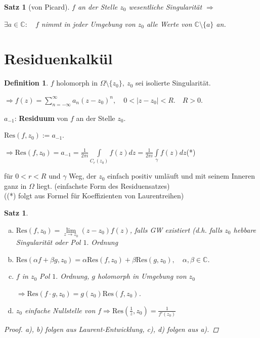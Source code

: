 \documentclass[ngerman,halfparskip]{scrartcl}
\newtheorem{satz}{Satz}[section]
\newtheorem*{satz*}{Satz}
\theoremstyle{definition}
\newtheorem{defin}{Definition}[section]
\def\C{\mathbb C}
\def\Res{\text{Res}}
\begin{document}
\begin{satz*}[von Picard]
$f$ an der Stelle $z_0$ wesentliche Singularität $\Rightarrow$

$\exists a\in\C: \quad f$ nimmt in jeder Umgebung von $z_0$ alle Werte von $\C\setminus\{a\}$ an.
\end{satz*}




\section{Residuenkalkül}
\begin{defin}
$f$ holomorph in $\Omega \setminus \{z_0\}, ~z_0$ sei isolierte Singularität. 

$\Rightarrow f(z)=\sum\limits_{n=-\infty}^\infty a_n(z-z_0)^n,\quad 0<|z-z_0|<R.\quad R>0$.

$a_{-1}$: \textbf{Residuum} von $f$ an der Stelle $z_0$.

$\Res (f,z_0):=a_{-1}$.
\end{defin}

$\Rightarrow \Res (f,z_0)=a_{-1}=\frac 1{2\pi i }\int\limits_{C_r(z_0)}f(z)dz=\frac 1{2\pi i }\int\limits_{\gamma}f(z)dz$\hfill (*)

für $0<r<R$ und $\gamma$ Weg, der $z_0$ einfach positiv umläuft und mit seinem Inneren ganz in $\Omega$ liegt. (einfachste Form des Residuensatzes)\\
((*) folgt aus Formel für Koeffizienten von Laurentreihen)

\begin{satz}~\\
\begin{enumerate}[a)]
\item $\Res (f,z_0)=\lim\limits_{z\rightarrow z_0 }(z-z_0) f(z)$, falls GW existiert (d.h. falls $z_0$ hebbare Singularität oder Pol $1.$ Ordnung
\item $\Res (\alpha f+\beta g,z_0)=\alpha \Res(f,z_0)+\beta \Res (g,z_0), \quad \alpha,\beta\in\C$.
\item $f$ in $z_0$ Pol $1.$ Ordnung, $g$ holomorph in Umgebung von $z_0$

$\Rightarrow \Res (f\cdot g, z_0)=g(z_0)\Res (f,z_0)$.
\item $z_0$ einfache Nullstelle von $f \Rightarrow \Res (\frac 1z, z_0) =\frac 1 {f'(z_0)}$
\end{enumerate}
\begin{proof}
a), b) folgen aus Laurent-Entwicklung, c), d) folgen aus a).
\end{proof}
\end{satz}
\end{document}
